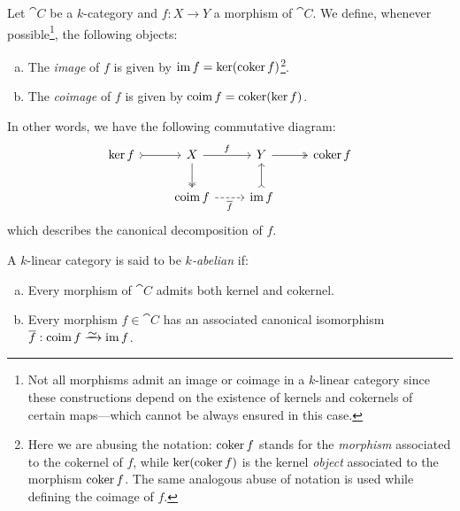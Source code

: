\begin{definition}[(Co)image]
    \label{def:k-linear-cat-image-coimage}
    Let \(\cat C\) be a \(k\)-category and \(f: X \to Y\) a morphism of \(\cat C\). We
    define, whenever possible\footnote{Not all morphisms admit an image or coimage
        in a \(k\)-linear category since these constructions depend on the existence
        of kernels and cokernels of certain maps---which cannot be always ensured in
        this case.}, the following objects:
    \begin{enumerate}[(a)]\setlength\itemsep{0em}
        \item The \emph{image} of \(f\) is given by
              \(\operatorname{im} f = \ker(\operatorname{coker} f)\)\footnote{Here we are abusing the notation:
                  \(\operatorname{coker} f\) stands for the \emph{morphism} associated to the cokernel of
                  \(f\), while \(\ker(\operatorname{coker} f)\) is the kernel \emph{object} associated to
                  the morphism \(\operatorname{coker} f\). The same analogous abuse of notation is used
                  while defining the coimage of \(f\).}.

        \item The \emph{coimage} of \(f\) is given by \(\operatorname{coim} f = \operatorname{coker}(\ker f)\).
    \end{enumerate}
    In other words, we have the following commutative diagram:
    \[
        \begin{tikzcd}
            \ker f \ar[r, tail]
            &X \ar[r, "f"] \ar[d, two heads]
            &Y \ar[r, two heads]
            &\coker f
            \\
            &\coim f \ar[r, dashed, "\overline f"']
            &\im f \ar[u, tail]
            &
        \end{tikzcd}
    \]
    which describes the canonical decomposition of \(f\).
\end{definition}

\begin{definition}
    \label{def:abelian-category}
    A \(k\)-linear category is said to be \emph{\(k\)-abelian} if:
    \begin{enumerate}[(a)]\setlength\itemsep{0em}
        \item Every morphism of \(\cat C\) admits both kernel and cokernel.
        \item Every morphism \(f \in \cat C\) has an associated canonical isomorphism
              \(\overline f: \coim f \isoto \im f\).
    \end{enumerate}
\end{definition}


